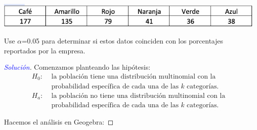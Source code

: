 \documentclass[a4paper,12pt]{article}
\newenvironment{solution}
  {\renewcommand\qedsymbol{$\square$}\begin{proof}[\textcolor{blue}{Solución}]}
  {\end{proof}}
\begin{document}
\begin{center}
    \includegraphics[scale=0.5]{images/Screen Shot 2021-05-11 at 15.47.58.png}
\end{center}
Use $\alpha$=0.05  para determinar si estos datos coinciden con los porcentajes reportados por la empresa.

\begin{solution}
Comenzamos planteando las hipótesis: 
\begin{align*}
        H_0: & 
             \text{ la población tiene una distribución multinomial con la}\\
            & \text{ probabilidad específica de cada una de las $k$ categorías.}\\
        H_a: &  
             \text{ la población no tiene una distribución multinomial con la}\\
         &\text{ probabilidad específica de cada una de las $k$ categorías.}
    \end{align*}
    
Hacemos el análisis en Geogebra: 


\end{solution}
\end{document}
